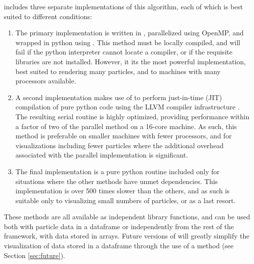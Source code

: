  includes three separate implementations of this algorithm, each of which is best suited to different conditions:
\begin{enumerate}
\item The primary implementation is written in , parallelized using OpenMP, and wrapped in python using .  This method must be locally compiled, and will fail if the python interpreter cannot locate a  compiler, or if the requisite libraries are not installed.  However, it its the most powerful implementation, best suited to rendering many particles, and to machines with many processors available.
\item A second implementation makes use of  \citep{LamPitrouSeibert2015} to perform just-in-time (JIT) compilation of pure python code using the LLVM compiler infrastructure \citep{LattnerAdve2004}.  The resulting serial routine is highly optimized, providing performance within a factor of two of the parallel method on a 16-core machine.  As such, this method is preferable on smaller machines with fewer processors, and for visualizations including fewer particles where the additional overhead associated with the parallel implementation is significant.
\item The final implementation is a pure python routine included only for situations where the other methods have unmet dependencies. This implementation is over 500 times slower than the others, and as such is suitable only to visualizing small numbers of particles, or as a last resort.
\end{enumerate}

These methods are all available as independent library functions, and can be used both with particle data in a  dataframe or independently from the rest of the  framework, with data stored in  arrays.  
Future versions of  will greatly simplify the visualization of data stored in a  dataframe through the use of a  method (see Section \ref{sec:future}).